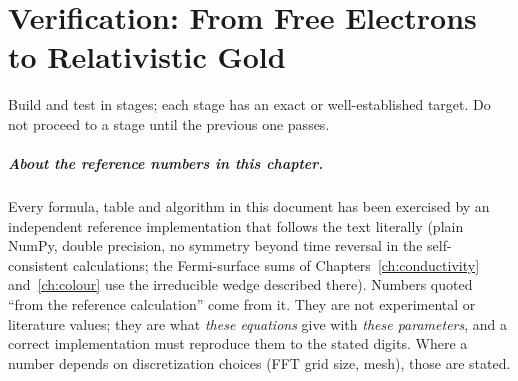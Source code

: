 \chapter{Verification: From Free Electrons to Relativistic Gold}
\label{ch:verify}

Build and test in stages; each stage has an exact or well-established
target. Do not proceed to a stage until the previous one passes.

\paragraph{About the reference numbers in this chapter.} Every formula,
table and algorithm in this document has been exercised by an independent
reference implementation that follows the text literally (plain NumPy,
double precision, no symmetry beyond time reversal in the self-consistent
calculations; the Fermi-surface sums of Chapters~\ref{ch:conductivity}
and~\ref{ch:colour} use the irreducible wedge described there). Numbers quoted
``from the reference calculation'' come from it. They are not
experimental or literature values; they are what \emph{these equations}
give with \emph{these parameters}, and a correct implementation must
reproduce them to the stated digits. Where a number depends on
discretization choices (FFT grid size, mesh), those are stated.

